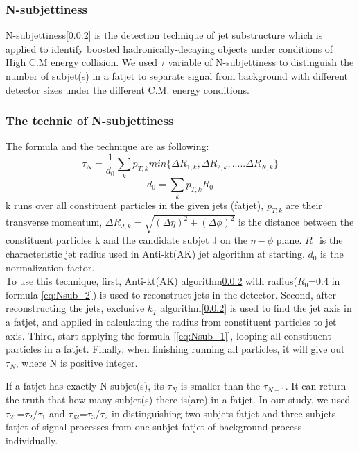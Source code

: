 \documentclass[12pt,twoside,a4paper,an,final]{cms-tdr}
\begin{document}
\subsubsection{N-subjettiness}
N-subjettiness[\ref{}] is the detection technique of jet substructure which is applied to identify boosted hadronically-decaying objects under conditions of High C.M energy collision. We used $\tau$ variable of N-subjettiness to distinguish the number of subjet(s) in a fatjet to separate signal from background with different detector sizes under the different C.M. energy conditions.\\

\subsubsection{The technic of N-subjettiness}
The formula and the technique are as following:\\
\begin{equation}\label{eq:Nsub_1}
\tau_{N}=\frac{1}{d_{0}}\sum_{k}p_{T,k} min\{\Delta R_{1,k},\Delta R_{2,k},.....\Delta R_{N,k}\}
\end{equation}
\begin{equation}\label{eq:Nsub_2}
d_{0}=\sum_{k}p_{T,k} R_{0}
\end{equation}
k runs over all constituent particles in the given jets (fatjet), $p_{T,k}$ are their transverse momentum, $\Delta R_{J,k}=\sqrt{(\Delta \eta)^{2}+(\Delta \phi)^{2}}$ is the distance between the constituent particles k and the candidate subjet J on the $\eta-\phi$ plane. $R_{0}$ is the characteristic jet radius used in Anti-kt(AK) jet algorithm at starting. $d_{0}$ is the normalization factor.\\

To use this technique, first, Anti-kt(AK) algorithm\ref{} with radius($R_{0}$=0.4 in formula \ref{eq:Nsub_2}) is used to reconstruct jets in the detector. Second, after reconstructing the jets, exclusive $k_{T}$ algorithm[\ref{}] is used to find the jet axis in a fatjet, and applied in calculating the radius from constituent particles to jet axis. Third, start applying the formula [\ref{eq:Nsub_1}], looping all constituent particles in a fatjet. Finally, when finishing running all particles, it will give out $\tau_{N}$, where N is positive integer. 

If a fatjet has exactly N subjet(s), its $\tau_{N}$ is smaller than the $\tau_{N-1}$. It can return the truth that how many subjet(s) there is(are) in a fatjet. In our study, we used $\tau_{21}$=$\tau_{2}$/$\tau_{1}$  and $\tau_{32}$=$\tau_{3}$/$\tau_{2}$ in distinguishing two-subjets fatjet and three-subjets fatjet of signal processes from one-subjet fatjet of background process individually. \\ 
\end{document}
